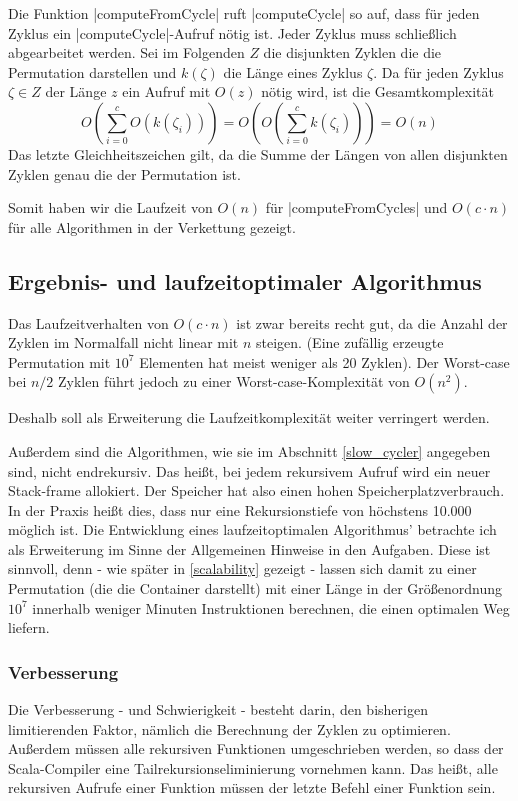 Die Funktion |computeFromCycle| ruft |computeCycle| so auf, dass für jeden Zyklus ein |computeCycle|-Aufruf nötig ist. Jeder Zyklus muss schließlich abgearbeitet werden.
Sei im Folgenden $Z$ die disjunkten Zyklen die die Permutation darstellen und $k(\zeta)$ die Länge eines Zyklus $\zeta$.
Da für jeden Zyklus $\zeta \in Z$ der Länge $z$ ein Aufruf mit $O(z)$ nötig wird, ist die Gesamtkomplexität
\[O(\sum_{i=0}^{c}{O(k(\zeta_i))})=O(O(\sum_{i=0}^{c}{k(\zeta_i)}))=O(n)\]
Das letzte Gleichheitszeichen gilt, da die Summe der Längen von allen disjunkten Zyklen genau die der Permutation ist.

Somit haben wir die Laufzeit von $O(n)$ für |computeFromCycles| und $O(c \cdot n)$ für alle Algorithmen in der Verkettung gezeigt.
\clearpage
\subsection{Ergebnis- und laufzeitoptimaler Algorithmus} %
Das Laufzeitverhalten von $O(c \cdot n)$ ist zwar bereits recht gut, da die Anzahl der Zyklen im Normalfall nicht linear mit $n$ steigen.
(Eine zufällig erzeugte Permutation mit $10^7$ Elementen hat meist weniger als 20 Zyklen).
Der Worst-case bei $n/2$ Zyklen führt jedoch zu einer Worst-case-Komplexität von $O(n^2)$.

Deshalb soll als Erweiterung die Laufzeitkomplexität weiter verringert werden.

Außerdem sind die Algorithmen, wie sie im Abschnitt \ref{slow_cycler} angegeben sind, nicht endrekursiv.
Das heißt, bei jedem rekursivem Aufruf wird ein neuer Stack-frame allokiert.
Der Speicher hat also einen hohen Speicherplatzverbrauch.
In der Praxis heißt dies, dass nur eine Rekursionstiefe von höchstens 10.000 möglich ist.
Die Entwicklung eines laufzeitoptimalen Algorithmus' betrachte ich als Erweiterung im Sinne der Allgemeinen Hinweise in den Aufgaben.
Diese ist sinnvoll, denn - wie später in \ref{scalability} gezeigt -
lassen sich damit zu einer Permutation (die die Container darstellt)
mit einer Länge in der Größenordnung $10^7$ innerhalb weniger Minuten Instruktionen berechnen, die einen optimalen Weg liefern.
\subsubsection{Verbesserung}
\label{fast_cycler}
Die Verbesserung - und Schwierigkeit - besteht darin, den bisherigen limitierenden Faktor, nämlich die Berechnung der Zyklen zu optimieren.
Außerdem müssen alle rekursiven Funktionen umgeschrieben werden, so dass der Scala-Compiler eine Tailrekursionseliminierung vornehmen kann.
Das heißt, alle rekursiven Aufrufe einer Funktion müssen der letzte Befehl einer Funktion sein.

